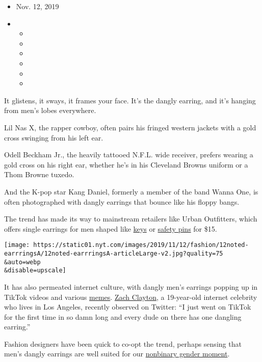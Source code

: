 \begin{itemize}
\item
  Nov. 12, 2019
\item
  \begin{itemize}
  \item
  \item
  \item
  \item
  \item
  \item
  \end{itemize}
\end{itemize}

It glistens, it sways, it frames your face. It's the dangly earring, and
it's hanging from men's lobes everywhere.

Lil Nas X, the rapper cowboy, often pairs his fringed western jackets
with a gold cross swinging from his left ear.

Odell Beckham Jr., the heavily tattooed N.F.L. wide receiver, prefers
wearing a gold cross on his right ear, whether he's in his Cleveland
Browns uniform or a Thom Browne tuxedo.

And the K-pop star Kang Daniel, formerly a member of the band Wanna One,
is often photographed with dangly earrings that bounce like his floppy
bangs.

The trend has made its way to mainstream retailers like Urban
Outfitters, which offers single earrings for men shaped like
\href{https://www.urbanoutfitters.com/shop/key-earring}{keys} or
\href{https://www.urbanoutfitters.com/shop/safety-pin-earring}{safety
pins} for \$15.

\texttt{[image: https://static01.nyt.com/images/2019/11/12/fashion/12noted-earrringsA/12noted-earrringsA-articleLarge-v2.jpg?quality=75\\\&auto=webp\\\&disable=upscale]}

It has also permeated internet culture, with dangly men's earrings
popping up in TikTok videos and various
\href{https://twitter.com/ar1stotl3/status/1087569934366855168?lang=en}{memes}.
\href{https://twitter.com/zachclayton/status/1161075884301807616}{Zach
Clayton}, a 19-year-old internet celebrity who lives in Los Angeles,
recently observed on Twitter: ``I just went on TikTok for the first time
in so damn long and every dude on there has one dangling earring.''

Fashion designers have been quick to co-opt the trend, perhaps sensing
that men's dangly earrings are well suited for our
\href{https://www.nytimes.com/2019/08/14/style/nonbinary.html}{nonbinary
gender moment}.

